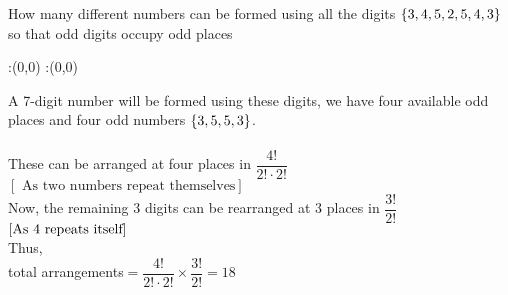 



\question[3] How many different numbers can be formed using all the digits $\lbrace{3,4,5,2,5,4,3}\rbrace$ so that odd digits occupy odd places 


\watchout

\ifprintanswers
  \begin{marginfigure}
      :(0,0)
      :(0,0)
    \figdrawbegin{}
      \figdrawline [100,101]
    \figdrawend
    \figvisu{\figBoxA}{}{%
    }
    \centerline{\box\figBoxA}
  \end{marginfigure}
\fi 

\begin{solution}[\mcq]
A 7-digit number will be formed using these digits, we have four available odd places and four odd numbers $\lbrace{3,5,5,3}\rbrace$.\\
\\
These can be arranged at four places in $\dfrac{4!}{2!\cdot2!}$ $\left[\text{ As two numbers repeat themselves} \right]$\\
Now, the remaining 3 digits can be rearranged at 3 places in $\dfrac{3!}{2!}$ $\left[ \text{As $4$ repeats itself} \right]$\\
Thus,\\
total arrangements$ =\dfrac{4!}{2!\cdot2!} \times \dfrac{3!}{2!} = 18$ 
\end{solution}

\ifprintanswers\begin{codex}\end{codex}\fi
